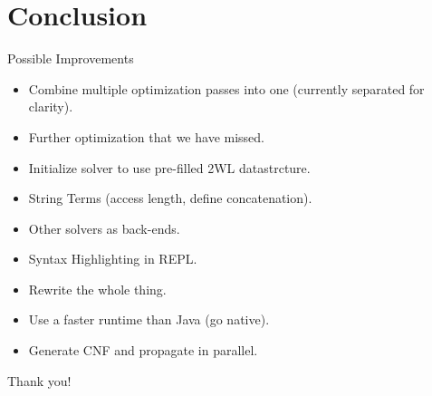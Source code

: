 \documentclass[smaller,dvipsnames,ratio=169]{beamer}
\begin{document}
  \section{Conclusion}

  \begin{frame}{Possible Improvements}
  	\begin{itemize}
  		\item Combine multiple optimization passes into one (currently separated for clarity).
  		\item Further optimization that we have missed.
  		\item Initialize solver to use pre-filled 2WL datastrcture.
  		\item String Terms (access length, define concatenation).
  		\item Other solvers as back-ends.
  		\item Syntax Highlighting in REPL.
  		\item Rewrite the whole thing.
  		\item Use a faster runtime than Java (go native).
  		\item Generate CNF and propagate in parallel.
  	\end{itemize}
  \end{frame}

  \begin{frame}[standout]
    Thank you!
  \end{frame}
\end{document}
